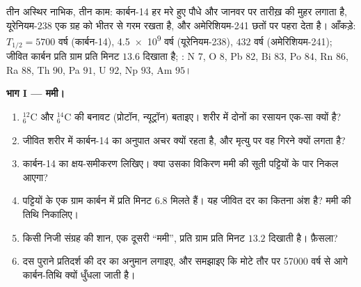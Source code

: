 \begin{problem}[{सप्ताहांत समस्या --- अस्थिर नाभिक के तीन पेशे: आधी होती
गिनतियों से आँकी गई एक ममी, यूरेनियम का संतुलित वंश-वृक्ष, एक धुआँ-संसूचक का
लेखा, और यह कि तारों का नश्वर होना क्यों ज़रूरी था}]
\label{pb:g11:nucleus-radioactivity:1}
तीन अस्थिर नाभिक, तीन काम: कार्बन-14 हर मरे हुए पौधे और जानवर पर तारीख़ की
मुहर लगाता है, यूरेनियम-238 एक ग्रह को भीतर से गरम रखता है, और अमेरिशियम-241
छतों पर पहरा देता है। आँकड़े: $T_{1/2} = \num{5700}$ वर्ष (कार्बन-14), \num{4.5e9} वर्ष (यूरेनियम-238),
$432$ वर्ष (अमेरिशियम-241); जीवित कार्बन प्रति ग्राम प्रति मिनट $13.6$ 
दिखाता है; : N $7$, O $8$, Pb $82$,
Bi $83$, Po $84$, Rn $86$, Ra $88$, Th $90$, Pa $91$,
U $92$, Np $93$, Am $95$।

\medskip
\noindent\textbf{भाग I --- ममी।}
\begin{enumerate}
  \item ${}^{12}_{6}\mathrm{C}$ और ${}^{14}_{6}\mathrm{C}$ की बनावट (प्रोटॉन, न्यूट्रॉन) बताइए। शरीर में
        दोनों का रसायन एक-सा क्यों है?
  \item जीवित शरीर में कार्बन-14 का अनुपात अचर क्यों रहता है, और मृत्यु पर
        वह गिरने क्यों लगता है?
  \item कार्बन-14 का क्षय-समीकरण लिखिए। क्या उसका विकिरण ममी की सूती
        पट्टियों के पार निकल आएगा?
  \item पट्टियों के एक ग्राम कार्बन में प्रति मिनट $6.8$  मिलते हैं।
        यह जीवित दर का कितना अंश है? ममी की तिथि निकालिए।
  \item किसी निजी संग्रह की शान, एक दूसरी ``ममी'', प्रति ग्राम प्रति मिनट
        $13.2$  दिखाती है। फ़ैसला?
  \item दस  पुराने प्रतिदर्श की दर का अनुमान लगाइए, और समझाइए कि
        मोटे तौर पर \num{57000} वर्ष से आगे कार्बन-तिथि क्यों धुँधला जाती है।
\end{enumerate}


\end{problem}
